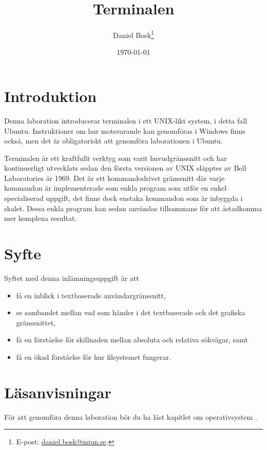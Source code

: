\documentclass[11pt,a4paper]{miunasgn}
\title{Terminalen}
\author{Daniel Bosk\footnote{%
	E-post: \href{mailto:daniel.bosk@miun.se}{daniel.bosk@miun.se}.
}}
\date{\today}
\begin{document}
\maketitle
\thispagestyle{foot}
\tableofcontents


\section{Introduktion}
\label{sec:Introduktion}
\noindent
Denna laboration introducerar terminalen i ett UNIX-likt system, i detta fall 
Ubuntu.
Instruktioner om hur motsvarande kan genomföras i Windows finns också, men det 
är obligatoriskt att genomföra laborationen i Ubuntu.

Terminalen är ett kraftfullt verktyg som varit huvudgränssnitt och har 
kontinuerligt utvecklats sedan den första versionen av UNIX släpptes av Bell 
Laboratories år 1969.
Det är ett kommandodrivet gränssnitt där varje kommandon är implementerade som 
enkla program som utför en enkel specialiserad uppgift, det finns dock enstaka 
kommandon som är inbyggda i skalet.
Dessa enkla program kan sedan användas tillsammans för att åstadkomma mer 
komplexa resultat.


\section{Syfte}
\label{sec:Syfte}
\noindent
Syftet med denna inlämningsuppgift är att
\begin{itemize}
	\item få en inblick i textbaserade användargränssnitt,
	\item se sambandet mellan vad som händer i det textbaserade och det
		grafiska gränssnittet,
	\item få en förståelse för skillnaden mellan absoluta och relativa
		sökvägar, samt
	\item få en ökad förståelse för hur filsystemet fungerar.
\end{itemize}


\section{Läsanvisningar}
\label{sec:Lasanvisningar}
\noindent
För att genomföra denna laboration bör du ha läst kapitlet om operativsystem 
\citep[kapitel 3]{Brookshear2012csa}.
\end{document}
